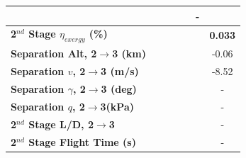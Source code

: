 \begin{table}[ht]
\begin{tabular}{l c c c c c c}
	& \firstsecondSeparationgammamSPARTANNinetySevenFive
	& \firstsecondSeparationgammamSPARTANStandard
	& \firstsecondSeparationgammamSPARTANOneHundredTwoFive
	& \firstsecondSeparationgammamSPARTANOneHundredFive
	& -
	\\
	\hline 
	\textbf{2$^{nd}$ Stage $\eta_{exergy}$ (\%)}
	& \textbf{\secondExergyEffmSPARTANNinetyFive}
	& \textbf{\secondExergyEffmSPARTANNinetySevenFive}
	& \textbf{\secondExergyEffmSPARTANStandard}
	& \textbf{\secondExergyEffmSPARTANOneHundredTwoFive}
	& \textbf{\secondExergyEffmSPARTANOneHundredFive}
	& \textbf{0.033}
	\\
	\textbf{Separation Alt, 2$\rightarrow$3 (km)}
	& \secondthirdSeparationAltmSPARTANNinetyFive
	& \secondthirdSeparationAltmSPARTANNinetySevenFive
	& \secondthirdSeparationAltmSPARTANStandard
	& \secondthirdSeparationAltmSPARTANOneHundredTwoFive
	& \secondthirdSeparationAltmSPARTANOneHundredFive
	&-0.06
	\\
	\textbf{Separation $v$, 2$\rightarrow$3 (m/s)}
	& \secondthirdSeparationvmSPARTANNinetyFive
	& \secondthirdSeparationvmSPARTANNinetySevenFive
	& \secondthirdSeparationvmSPARTANStandard
	& \secondthirdSeparationvmSPARTANOneHundredTwoFive
	& \secondthirdSeparationvmSPARTANOneHundredFive
	&-8.52
	\\
	\textbf{Separation $\gamma$, 2$\rightarrow$3 (deg)}
	& \secondthirdSeparationgammamSPARTANNinetyFive
	& \secondthirdSeparationgammamSPARTANNinetySevenFive
	& \secondthirdSeparationgammamSPARTANStandard
	& \secondthirdSeparationgammamSPARTANOneHundredTwoFive
	& \secondthirdSeparationgammamSPARTANOneHundredFive
	& -
	\\
	\textbf{Separation $q$, 2$\rightarrow$3(kPa)}
	& \secondthirdSeparationqmSPARTANNinetyFive
	& \secondthirdSeparationqmSPARTANNinetySevenFive
	& \secondthirdSeparationqmSPARTANStandard
	& \secondthirdSeparationqmSPARTANOneHundredTwoFive
	& \secondthirdSeparationqmSPARTANOneHundredFive
	& -
	\\
	\textbf{2$^{nd}$ Stage L/D, 2$\rightarrow$3}
	& \secondthirdSeparationLDmSPARTANNinetyFive
	& \secondthirdSeparationLDmSPARTANNinetySevenFive
	& \secondthirdSeparationLDmSPARTANStandard
	& \secondthirdSeparationLDmSPARTANOneHundredTwoFive
	& \secondthirdSeparationLDmSPARTANOneHundredFive
	& -
	\\
	\textbf{2$^{nd}$ Stage Flight Time (s)}
	& \secondFlightTimemSPARTANNinetyFive
	& \secondFlightTimemSPARTANNinetySevenFive
	& \secondFlightTimemSPARTANStandard
	& \secondFlightTimemSPARTANOneHundredTwoFive
	& \secondFlightTimemSPARTANOneHundredFive
	& -

\end{tabular}
\end{table}
